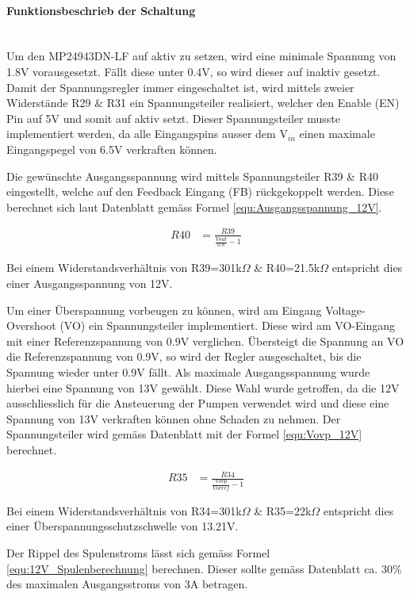 \paragraph{Funktionsbeschrieb der Schaltung}\mbox{}\\

Um den MP24943DN-LF auf aktiv zu setzen, wird eine minimale Spannung von 1.8V vorausgesetzt. Fällt diese unter 0.4V, so wird dieser auf inaktiv gesetzt. Damit der Spannungsregler immer eingeschaltet ist, wird mittels zweier Widerstände R29 \& R31 ein Spannungsteiler realisiert, welcher den Enable (EN) Pin auf 5V und somit auf aktiv setzt. Dieser Spannungsteiler musste implementiert werden, da alle Eingangspins ausser dem V$_{in}$ einen maximale Eingangspegel von 6.5V verkraften können.

Die gewünschte Ausgangsspannung wird mittels Spannungsteiler R39 \& R40 eingestellt, welche auf den Feedback Eingang (FB) rückgekoppelt werden. Diese berechnet sich laut Datenblatt gemäss Formel \ref{equ:Ausgangsspannung_12V}. 

\begin{align}
R40 &= \frac{R39}{\frac{Vout}{0.8}-1}
\label{equ:Ausgangsspannung_12V}
\end{align}

Bei einem Widerstandsverhältnis von R39=301k$\Omega$ \& R40=21.5k$\Omega$ entspricht dies einer Ausgangsspannung von 12V.

Um einer Überspannung vorbeugen zu können, wird am Eingang Voltage-Overshoot (VO) ein Spannungsteiler implementiert. Diese wird am VO-Eingang mit einer Referenzspannung von 0.9V verglichen. Übersteigt die Spannung an VO die Referenzspannung von 0.9V, so wird der Regler ausgeschaltet, bis die Spannung wieder unter 0.9V fällt. Als maximale Ausgangsspannung wurde hierbei eine Spannung von 13V gewählt. Diese Wahl wurde getroffen, da die 12V ausschliesslich für die Ansteuerung der Pumpen verwendet wird und diese eine Spannung von 13V verkraften können ohne Schaden zu nehmen. Der Spannungsteiler wird gemäss Datenblatt mit der Formel \ref{equ:Vovp_12V} berechnet. 

\begin{align}
R35 &= \frac{R34}{\frac{Vovp}{Vovref}-1}
\label{equ:Vovp_12V}
\end{align}

Bei einem Widerstandsverhältnis von R34=301k$\Omega$ \& R35=22k$\Omega$ entspricht dies einer Überspannungsschutzschwelle von 13.21V. 

Der Rippel des Spulenstroms lässt sich gemäss Formel \ref{equ:12V_Spulenberechnung} berechnen. Dieser sollte gemäss Datenblatt ca. 30\% des maximalen Ausgangsstroms von 3A betragen. 

